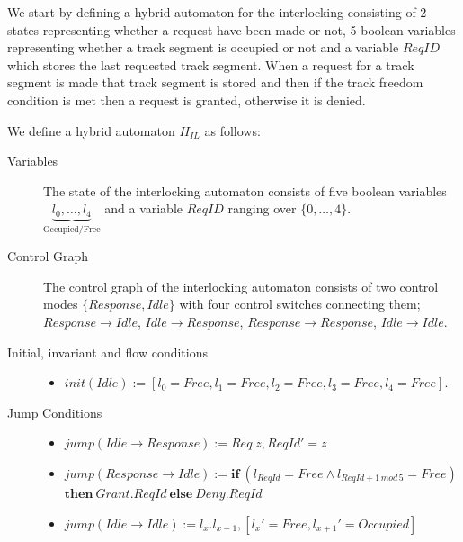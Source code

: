 We start by defining a hybrid automaton for the interlocking consisting of 2 states representing whether a request have been made or not, 5 boolean variables representing whether a track segment is occupied or not and a variable $ReqID$ which stores the last requested track segment. When a request for a track segment is made that track segment is stored and then if the track freedom condition is met then a request is granted, otherwise it is denied.

\begin{mydef}
We define a hybrid automaton $H_{IL}$ as follows:
\begin{description}
\item[Variables] The state of the interlocking automaton consists of five boolean variables  $\underbrace{l_0, \ldots , l_4}_\text{Occupied/Free}$ and a variable $ReqID$ ranging over $\{0 , \ldots , 4 \}$.

\item[Control Graph] The control graph of the interlocking automaton consists of two control modes $\{Response, Idle \}$ with four control switches connecting them; $Response \to Idle$, $Idle \to Response$, $Response \to Response$, $Idle \to Idle$.

\item[Initial, invariant and flow conditions] \hspace*{0mm}
	\begin{itemize}
	\item $init(Idle) := [l_0 = Free, l_1 = Free, l_2 = Free, l_3 = Free, l_4 = Free]$.

	\end{itemize}

\item[Jump Conditions] \hspace*{0mm}

	\begin{itemize}
	\item $jump(Idle \to Response) :=  Req.z , ReqId' = z$

	
	\item $jump(Response \to Idle) := \mathbf{if} \ (l_{ReqId} = Free \wedge l_{ReqId +1 \, mod \, 5} = Free)$ \\
             \hspace{\fill} $\mathbf{then} \ Grant. ReqId \ \mathbf{else} \ Deny.ReqId$ 

	\item $jump(Idle \to Idle) := l_x. l_{x+1} , [l_x' = Free, l_{x+1}' = Occupied]$


\end{itemize}
\end{description}
\end{mydef}
